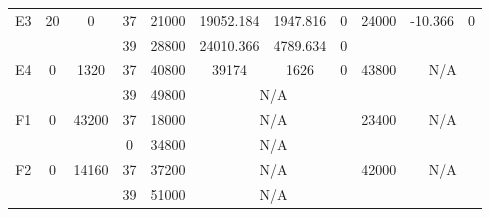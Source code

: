 \begin{sidewaystable}
\begin{tabular}{c||c|c||c|c|c|c|c||c|c|c}
         &
        
      \\
      \hline
      \multirow{2}{*}{E3} &
      \multirow{2}{*}{20} &
      \multirow{2}{*}{0} &
      37 &
      21000 &
        19052.184 &
        1947.816 &
        0 &
      \multirow{2}{*}{24000} &
        \multirow{2}{*}{-10.366} &
        \multirow{2}{*}{0}
      \\
      \cline{4-8}
       &
       &
       &
      39 &
      28800 &
        24010.366 &
        4789.634 &
        0 &
      
         &
        
      \\
      \hline
      \multirow{2}{*}{E4} &
      \multirow{2}{*}{0} &
      \multirow{2}{*}{1320} &
      37 &
      40800 &
        39174 &
        1626 &
        0 &
      \multirow{2}{*}{43800} &
        \multicolumn{2}{c}{\multirow{2}{*}{N/A}}
      \\
      \cline{4-8}
       &
       &
       &
      39 &
      49800 &
        \multicolumn{3}{|c||}{N/A} &
      
        
      \\
      \hline
      \multirow{2}{*}{F1} &
      \multirow{2}{*}{0} &
      \multirow{2}{*}{43200} &
      37 &
      18000 &
        \multicolumn{3}{|c||}{N/A} &
      \multirow{2}{*}{23400} &
        \multicolumn{2}{c}{\multirow{2}{*}{N/A}}
      \\
      \cline{4-8}
       &
       &
       &
      0 &
      34800 &
        \multicolumn{3}{|c||}{N/A} &
      
        
      \\
      \hline
      \multirow{2}{*}{F2} &
      \multirow{2}{*}{0} &
      \multirow{2}{*}{14160} &
      37 &
      37200 &
        \multicolumn{3}{|c||}{N/A} &
      \multirow{2}{*}{42000} &
        \multicolumn{2}{c}{\multirow{2}{*}{N/A}}
      \\
      \cline{4-8}
       &
       &
       &
      39 &
      51000 &
        \multicolumn{3}{|c||}{N/A} &
      
        
      \\
\end{tabular}
\label{table:RDS3-11023.tex} 
\end{sidewaystable}
